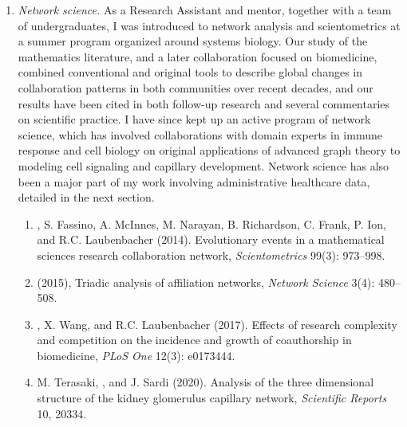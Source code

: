 \documentclass{nihbiosketch}
\begin{document}
\begin{enumerate}

\item \emph{Network science.}
As a Research Assistant and mentor, together with a team of undergraduates, I was introduced to network analysis and scientometrics at a summer program organized around systems biology.
Our study of the mathematics literature, and a later collaboration focused on biomedicine, combined conventional and original tools to describe global changes in collaboration patterns in both communities over recent decades, and our results have been cited in both follow-up research and several commentaries on scientific practice.
I have since kept up an active program of network science, which has involved collaborations with domain experts in immune response and cell biology on original applications of advanced graph theory to modeling cell signaling and capillary development.
Network science has also been a major part of my work involving administrative healthcare data, detailed in the next section.

\begin{enumerate}
\item {}, S. Fassino, A. McInnes, M. Narayan, B. Richardson, C. Frank, P. Ion, and R.C. Laubenbacher (2014). Evolutionary events in a mathematical sciences research collaboration network, \emph{Scientometrics} 99(3): 973--998.
\item {} (2015), Triadic analysis of affiliation networks, \emph{Network Science} 3(4): 480--508.
\item {}, X. Wang, and R.C. Laubenbacher (2017). Effects of research complexity and competition on the incidence and growth of coauthorship in biomedicine, \emph{PLoS One} 12(3): e0173444.
\item M. Terasaki, , and J. Sardi (2020). Analysis of the three dimensional structure of the kidney glomerulus capillary network, \emph{Scientific Reports} 10, 20334.
\end{enumerate}


\end{enumerate}
\end{document}
